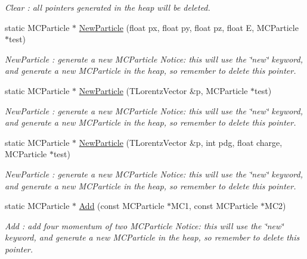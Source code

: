 \begin{DoxyCompactItemize}
\begin{DoxyCompactList}\small\item\em Clear : all pointers generated in the heap will be deleted. \item\end{DoxyCompactList}\item 
static MCParticle $\ast$ \hyperlink{classToolSet_1_1CMC_ab30c29f999f2b3dd1c85ed68636f2281}{NewParticle} (float px, float py, float pz, float E, MCParticle $\ast$test)
\begin{DoxyCompactList}\small\item\em NewParticle : generate a new MCParticle Notice: this will use the \char`\"{}new\char`\"{} keyword, and generate a new MCParticle in the heap, so remember to delete this pointer. \item\end{DoxyCompactList}\item 
static MCParticle $\ast$ \hyperlink{classToolSet_1_1CMC_a5bd1a7515135570ef348bd77d1d26933}{NewParticle} (TLorentzVector \&p, MCParticle $\ast$test)
\begin{DoxyCompactList}\small\item\em NewParticle : generate a new MCParticle Notice: this will use the \char`\"{}new\char`\"{} keyword, and generate a new MCParticle in the heap, so remember to delete this pointer. \item\end{DoxyCompactList}\item 
static MCParticle $\ast$ \hyperlink{classToolSet_1_1CMC_af2758c1110b4a2d0708a62465a1ad82d}{NewParticle} (TLorentzVector \&p, int pdg, float charge, MCParticle $\ast$test)
\begin{DoxyCompactList}\small\item\em NewParticle : generate a new MCParticle Notice: this will use the \char`\"{}new\char`\"{} keyword, and generate a new MCParticle in the heap, so remember to delete this pointer. \item\end{DoxyCompactList}\item 
static MCParticle $\ast$ \hyperlink{classToolSet_1_1CMC_ad1b2172aaacc40d4f5971492a5d1a0f5}{Add} (const MCParticle $\ast$MC1, const MCParticle $\ast$MC2)
\begin{DoxyCompactList}\small\item\em Add : add four momentum of two MCParticle Notice: this will use the \char`\"{}new\char`\"{} keyword, and generate a new MCParticle in the heap, so remember to delete this pointer. \item\end{DoxyCompactList}\item 

\end{DoxyCompactItemize}
